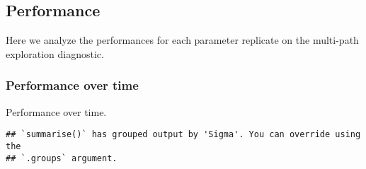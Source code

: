 \documentclass[]{book}
\newenvironment{Shaded}{\begin{snugshade}}{\end{snugshade}}
\newcommand{\DataTypeTok}[1]{\textcolor[rgb]{0.13,0.29,0.53}{#1}}
\newcommand{\KeywordTok}[1]{\textcolor[rgb]{0.13,0.29,0.53}{\textbf{#1}}}
\newcommand{\NormalTok}[1]{#1}
\newcommand{\OperatorTok}[1]{\textcolor[rgb]{0.81,0.36,0.00}{\textbf{#1}}}
\newcommand{\StringTok}[1]{\textcolor[rgb]{0.31,0.60,0.02}{#1}}
\begin{document}
\hypertarget{performance-5}{%
\subsection{Performance}\label{performance-5}}

Here we analyze the performances for each parameter replicate on the multi-path exploration diagnostic.

\hypertarget{performance-over-time-16}{%
\subsubsection{Performance over time}\label{performance-over-time-16}}

Performance over time.

\begin{Shaded}
\end{Shaded}

\begin{verbatim}
## `summarise()` has grouped output by 'Sigma'. You can override using the
## `.groups` argument.
\end{verbatim}
\end{document}
